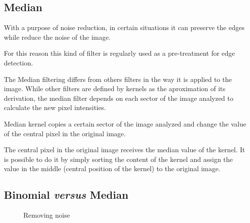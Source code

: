 \documentclass{article}
\begin{document}
	\subsection{Median}

		With a purpose of noise reduction, in certain situations it can preserve the edges while reduce the noise of the image.

		For this reason this kind of filter is regularly used as a pre-treatment for edge detection.

		The Median filtering differs from others filters in the way it is applied to the image. While other filters are defined by kernels as the aproximation of its derivation, the median filter depends on each sector of the image analyzed to calculate the new pixel intensities.

		Median kernel copies a certain sector of the image analyzed and change the value of the central pixel in the original image. 

		The central pixel in the original image receives the median value of the kernel. It is possible to do it by simply sorting the content of the kernel and assign the value in the middle (central position of the kernel) to the original image. 

	\subsection{Binomial {\it versus} Median}

		\begin{figure}[H]
		  \centering
		  \caption{Removing noise}
		  \label{fig:removingnoise}
		\end{figure}		
\end{document}
